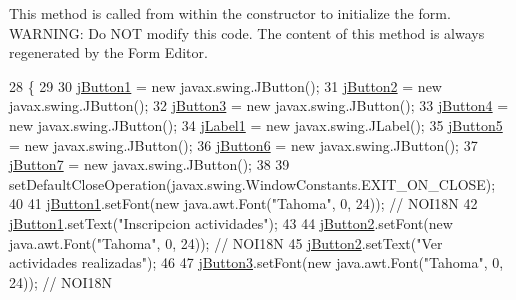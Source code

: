 This method is called from within the constructor to initialize the form. W\+A\+R\+N\+I\+NG\+: Do N\+OT modify this code. The content of this method is always regenerated by the Form Editor. 
\begin{DoxyCode}
28                                   \{
29 
30         \mbox{\hyperlink{classinterfacessoguar_1_1presoscu07_a32fac137cfd5dc354e4cfa6ee0530f76}{jButton1}} = \textcolor{keyword}{new} javax.swing.JButton();
31         \mbox{\hyperlink{classinterfacessoguar_1_1presoscu07_a35492e43d1e9d8728a881acf30bff4c3}{jButton2}} = \textcolor{keyword}{new} javax.swing.JButton();
32         \mbox{\hyperlink{classinterfacessoguar_1_1presoscu07_ab74517a901b30e28dab9f184845d8e00}{jButton3}} = \textcolor{keyword}{new} javax.swing.JButton();
33         \mbox{\hyperlink{classinterfacessoguar_1_1presoscu07_a59d84610b52e55806c464f05ac4d1f9a}{jButton4}} = \textcolor{keyword}{new} javax.swing.JButton();
34         \mbox{\hyperlink{classinterfacessoguar_1_1presoscu07_a085ba36143328d4629072e229e1b5acb}{jLabel1}} = \textcolor{keyword}{new} javax.swing.JLabel();
35         \mbox{\hyperlink{classinterfacessoguar_1_1presoscu07_a235597181f1514e6ad0aa24146a9ea4a}{jButton5}} = \textcolor{keyword}{new} javax.swing.JButton();
36         \mbox{\hyperlink{classinterfacessoguar_1_1presoscu07_a43f487b75785b57a2b918d23dfc94611}{jButton6}} = \textcolor{keyword}{new} javax.swing.JButton();
37         \mbox{\hyperlink{classinterfacessoguar_1_1presoscu07_a3f67db575069b29512c7ce7b0f2e8062}{jButton7}} = \textcolor{keyword}{new} javax.swing.JButton();
38 
39         setDefaultCloseOperation(javax.swing.WindowConstants.EXIT\_ON\_CLOSE);
40 
41         \mbox{\hyperlink{classinterfacessoguar_1_1presoscu07_a32fac137cfd5dc354e4cfa6ee0530f76}{jButton1}}.setFont(\textcolor{keyword}{new} java.awt.Font(\textcolor{stringliteral}{"Tahoma"}, 0, 24)); \textcolor{comment}{// NOI18N}
42         \mbox{\hyperlink{classinterfacessoguar_1_1presoscu07_a32fac137cfd5dc354e4cfa6ee0530f76}{jButton1}}.setText(\textcolor{stringliteral}{"Inscripcion actividades"});
43 
44         \mbox{\hyperlink{classinterfacessoguar_1_1presoscu07_a35492e43d1e9d8728a881acf30bff4c3}{jButton2}}.setFont(\textcolor{keyword}{new} java.awt.Font(\textcolor{stringliteral}{"Tahoma"}, 0, 24)); \textcolor{comment}{// NOI18N}
45         \mbox{\hyperlink{classinterfacessoguar_1_1presoscu07_a35492e43d1e9d8728a881acf30bff4c3}{jButton2}}.setText(\textcolor{stringliteral}{"Ver actividades realizadas"});
46 
47         \mbox{\hyperlink{classinterfacessoguar_1_1presoscu07_ab74517a901b30e28dab9f184845d8e00}{jButton3}}.setFont(\textcolor{keyword}{new} java.awt.Font(\textcolor{stringliteral}{"Tahoma"}, 0, 24)); \textcolor{comment}{// NOI18N}

\end{DoxyCode}
